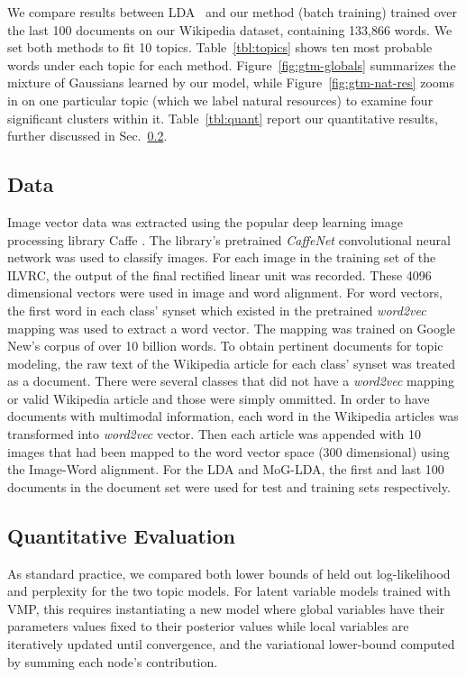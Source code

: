 \documentclass[11pt]{article}
\begin{document}
We compare results between LDA~\cite{Blei03} and our method (batch training) trained over the last 100 documents on our Wikipedia dataset, containing 133,866 words. We set both methods to fit 10 topics. Table~\ref{tbl:topics} shows ten most probable words under each topic for each method. Figure~\ref{fig:gtm-globals} summarizes the mixture of Gaussians learned by our model, while Figure~\ref{fig:gtm-nat-res} zooms in on one particular topic (which we label natural resources) to examine four significant clusters within it. Table~\ref{tbl:quant} report our quantitative results, further discussed in Sec.~\ref{sec:quant}.

\subsection{Data}
\label{sec:data}
Image vector data was extracted using the popular deep learning image processing library Caffe \cite{Jia14}. The library's pretrained \textit{CaffeNet} convolutional neural network was used to classify images. For each image in the training set of the ILVRC, the output of the final rectified linear unit was recorded. These 4096 dimensional vectors were used in image and word alignment. For word vectors, the first word in each class' synset which existed in the pretrained \textit{word2vec} \cite{Mikolov13a} mapping was used to extract a word vector. The mapping was trained on Google New's corpus of over 10 billion words. To obtain pertinent documents for topic modeling, the raw text of the Wikipedia article for each class' synset was treated as a document. There were several classes that did not have a \textit{word2vec} mapping or valid Wikipedia article and those were simply ommitted. In order to have documents with multimodal information, each word in the Wikipedia articles was transformed into \textit{word2vec} vector. Then each article was appended with 10 images that had been mapped to the word vector space (300 dimensional) using the Image-Word alignment. For the LDA and MoG-LDA, the first and last 100 documents in the document set were used for test and training sets respectively.

\subsection{Quantitative Evaluation}
\label{sec:quant}
As standard practice, we compared both lower bounds of held out log-likelihood and perplexity for the two topic models. For latent variable models trained with VMP, this requires instantiating a new model where global variables have their parameters values fixed to their posterior values while local variables are iteratively updated until convergence, and the variational lower-bound computed by summing each node's contribution.
\end{document}
